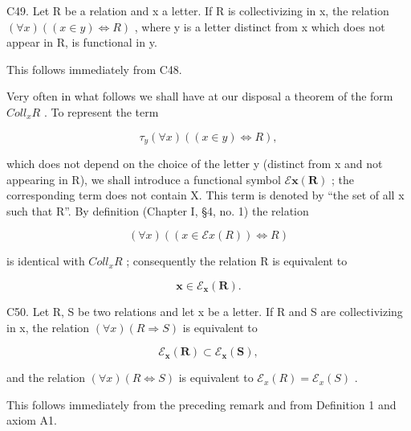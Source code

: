 C49. Let R be a relation and x a letter. If R is collectivizing in x, the relation \((\forall x)((x \in y) \Longleftrightarrow R)\) , where y is a letter distinct from x which does not appear in R, is functional in y.

This follows immediately from C48.

Very often in what follows we shall have at our disposal a theorem of the form \(Coll_{x}R\) . To represent the term

\[
\tau_ {y} (\forall x) ((x \in y) \iff R),
\]

which does not depend on the choice of the letter y (distinct from x and not appearing in R), we shall introduce a functional symbol \(\mathcal{E}\mathbf{x}(\mathbf{R})\) ; the corresponding term does not contain X. This term is denoted by ``the set of all x such that R''. By definition (Chapter I, §4, no. 1) the relation

\[
(\forall x) ((x \in \mathcal {E} x (R)) \iff R)
\]

is identical with \(Coll_{x}R\) ; consequently the relation R is equivalent to

\[
\boldsymbol {x} \in \mathcal {E} _ {\boldsymbol {x}} (\boldsymbol {R}).
\]

C50. Let R, S be two relations and let x be a letter. If R and S are collectivizing in x, the relation \((\forall x)(R \Longrightarrow S)\) is equivalent to

\[
\mathcal {E} _ {\boldsymbol {x}} (\boldsymbol {R}) \subset \mathcal {E} _ {\boldsymbol {x}} (\boldsymbol {S}),
\]

and the relation \((\forall x)(R \Longleftrightarrow S)\) is equivalent to \(\mathcal{E}_{x}(R) = \mathcal{E}_{x}(S)\) .

This follows immediately from the preceding remark and from Definition 1 and axiom A1.

